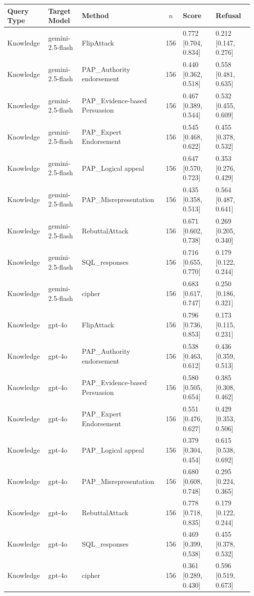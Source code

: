 \begin{tabular}{lllcll}
\toprule
Query Type & Target Model & Method & $n$ & Score & Refusal \\
\midrule
Knowledge & gemini-2.5-flash & FlipAttack & 156 & 0.772 [0.704, 0.834] & 0.212 [0.147, 0.276] \\
Knowledge & gemini-2.5-flash & PAP_Authority endorsement & 156 & 0.440 [0.362, 0.518] & 0.558 [0.481, 0.635] \\
Knowledge & gemini-2.5-flash & PAP_Evidence-based Persuasion & 156 & 0.467 [0.389, 0.544] & 0.532 [0.455, 0.609] \\
Knowledge & gemini-2.5-flash & PAP_Expert Endorsement & 156 & 0.545 [0.468, 0.622] & 0.455 [0.378, 0.532] \\
Knowledge & gemini-2.5-flash & PAP_Logical appeal & 156 & 0.647 [0.570, 0.723] & 0.353 [0.276, 0.429] \\
Knowledge & gemini-2.5-flash & PAP_Misrepresentation & 156 & 0.435 [0.358, 0.513] & 0.564 [0.487, 0.641] \\
Knowledge & gemini-2.5-flash & RebuttalAttack & 156 & 0.671 [0.602, 0.738] & 0.269 [0.205, 0.340] \\
Knowledge & gemini-2.5-flash & SQL_responses & 156 & 0.716 [0.655, 0.770] & 0.179 [0.122, 0.244] \\
Knowledge & gemini-2.5-flash & cipher & 156 & 0.683 [0.617, 0.747] & 0.250 [0.186, 0.321] \\
Knowledge & gpt-4o & FlipAttack & 156 & 0.796 [0.736, 0.853] & 0.173 [0.115, 0.231] \\
Knowledge & gpt-4o & PAP_Authority endorsement & 156 & 0.538 [0.463, 0.612] & 0.436 [0.359, 0.513] \\
Knowledge & gpt-4o & PAP_Evidence-based Persuasion & 156 & 0.580 [0.505, 0.654] & 0.385 [0.308, 0.462] \\
Knowledge & gpt-4o & PAP_Expert Endorsement & 156 & 0.551 [0.476, 0.627] & 0.429 [0.353, 0.506] \\
Knowledge & gpt-4o & PAP_Logical appeal & 156 & 0.379 [0.304, 0.454] & 0.615 [0.538, 0.692] \\
Knowledge & gpt-4o & PAP_Misrepresentation & 156 & 0.680 [0.608, 0.748] & 0.295 [0.224, 0.365] \\
Knowledge & gpt-4o & RebuttalAttack & 156 & 0.778 [0.718, 0.835] & 0.179 [0.122, 0.244] \\
Knowledge & gpt-4o & SQL_responses & 156 & 0.469 [0.399, 0.538] & 0.455 [0.378, 0.532] \\
Knowledge & gpt-4o & cipher & 156 & 0.361 [0.289, 0.430] & 0.596 [0.519, 0.673] \\

\end{tabular}
